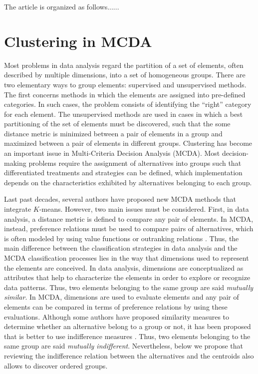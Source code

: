 \documentclass[]{elsarticle}
\theoremstyle{definition}
\begin{document}
The article is organized as follows......

\section{Clustering in MCDA}

Most problems in data analysis regard the partition of a set of elements, often described by multiple dimensions, into a set of homogeneous groups. There are two elementary ways to group elements: supervised and unsupervised methods.  The first concerns methods in which the elements are assigned into pre-defined categories. In such cases, the problem consists of identifying the ``right'' category for each element. The unsupervised methods are used in cases in which  a best partitioning of the set of elements must be discovered, such that the some distance metric is minimized between a pair of elements in a group and maximized between a pair of elements in different groups.  Clustering has become an important issue in Multi-Criteria Decision Analysis (MCDA).  Most decision-making problems require the assignment of alternatives into groups such that differentiated treatments and strategies can be defined, which implementation depends on the characteristics exhibited by alternatives belonging to each group. 

Last past decades,  several authors have proposed new MCDA methods that  integrate  $K$-means. However, two main issues must be considered. First, in data analysis,  a distance metric is defined to compare any pair of elements. In MCDA, instead, preference relations must be used to compare pairs of alternatives, which is often modeled by using value functions or outranking relations \citep{roy96, figueira2010}. Thus, the main difference between the classification strategies in data analysis  and the MCDA classification processes lies in the way that dimensions used to represent the elements are conceived.  In data analysis,  dimensions are conceptualized as attributes that help to characterize the elements in order to explore or recognize data patterns. Thus, two elements belonging to the same group are said \emph{mutually similar}.  In MCDA,  dimensions are used to evaluate elements and any pair of elements can be compared in terms of preference relations by using these evaluations. Although some authors have proposed similarity measures to determine whether an alternative belong to a group or not, it has been proposed that is better to use indifference measures  \citep{Olteanu2013}. Thus, two elements belonging to the same group are said \emph{mutually indifferent}. Nevertheless, below we propose that reviewing the indifference relation between the alternatives and the centroids also allows to discover ordered groups.
\end{document}
